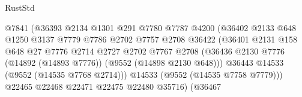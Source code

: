 \begin{lexlean}{RustStd}
\begin{coremodule}
                                            @7841
                                            (@36393
                                              @2134
                                              @1301
                                              @291
                                              @7780
                                              @7787
                                              @4200
                                              (@36402
                                                @2133
                                                @648
                                                @1250
                                                @3137
                                                @7779
                                                @7786
                                                @2702
                                                @7757
                                                @2708
                                                @36422
                                                (@36401
                                                  @2131
                                                  @158
                                                  @648
                                                  @27
                                                  @7776
                                                  @2714
                                                  @2727
                                                  @2702
                                                  @7767
                                                  @2708
                                                  (@36436
                                                    @2130
                                                    @7776
                                                    (@14892 (@14893 @7776))
                                                    (@9552 (@14898 @2130 @648)))
                                                  @36443
                                                  @14533
                                                  (@9552 (@14535 @7768 @2714)))
                                                @14533
                                                (@9552 (@14535 @7758 @7779)))
                                              @22465
                                              @22468
                                              @22471
                                              @22475
                                              @22480
                                              @35716)
                                            (@36467

\end{coremodule}
\end{lexlean}
